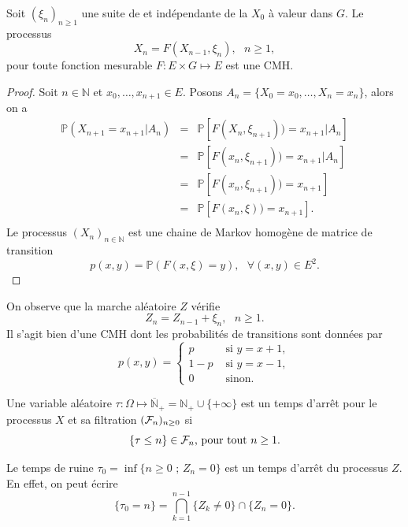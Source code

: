 \begin{prop}
Soit $(\xi_n)_{n\geq1}$ une suite de \va \iid et indépendante de la \va $X_0$ à valeur dans $G$. Le processus
$$
X_n = F(X_{n-1}, \xi_n),\text{ }n\geq1,
$$
pour toute fonction mesurable $F:E\times G\mapsto E$ est une CMH.
\end{prop}
\begin{proof}
Soit $n\in\mathbb{N}$ et $x_0,\ldots,x_{n+1}\in E$. Posons $A_n=\{X_0=x_0,\ldots,X_n=x_n\}$, alors on a
\begin{eqnarray*}
\mathbb{P}(X_{n+1}=x_{n+1}|A_n)&=&\mathbb{P}[F(X_n,\xi_{n+1}))=x_{n+1}|A_n]\\
&=&\mathbb{P}[F(x_n,\xi_{n+1}))=x_{n+1}|A_n]\\
&=&\mathbb{P}[F(x_n,\xi_{n+1}))=x_{n+1}]\\
&=&\mathbb{P}[F(x_n,\xi))=x_{n+1}].\\
\end{eqnarray*}
Le processus $(X_n)_{n\in\mathbb{N}}$ est une chaine de Markov homogène de matrice de transition
$$
p(x,y)=\mathbb{P}(F(x,\xi)=y),\text{ }\forall (x,y)\in E^{2}.
$$
\end{proof}
\begin{ex}
On observe que la marche aléatoire $Z$ vérifie
$$
Z_{n} = Z_{n-1} + \xi_{n},\text{ }n\geq1.
$$
Il s'agit bien d'une CMH dont les probabilités de transitions sont données par 
$$
p(x,y) = \begin{cases}
p&\text{ si }y = x+1,\\
1-p&\text{ si }y = x-1,\\
0& \text{ sinon}.
\end{cases}
$$
\end{ex}
\begin{definition}\label{def:temps_arret}
Une variable aléatoire $\tau:\Omega\mapsto \overline{\mathbb{N}}_+ = \mathbb{N}_+\cup\{+\infty\}$ est un temps d'arrêt pour le processus $X$ et sa filtration $(\mathcal{F}_n)_{n\geq0}$ si 
$$
\{\tau\leq n\}\in \mathcal{F}_n\text{, pour tout }n\geq1.
$$
\end{definition}
\begin{ex}\label{ex:dp_time}
Le temps de ruine $\tau_0 = \inf\{n \geq0\text{ ; }Z_n = 0\}$ est un temps d'arrêt du processus $Z$. En effet, on peut écrire 
$$
\{\tau_0=n \} = \bigcap_{k=1}^{n-1}\{Z_k\neq 0\}\cap\{Z_n = 0\}.
$$
\end{ex}

